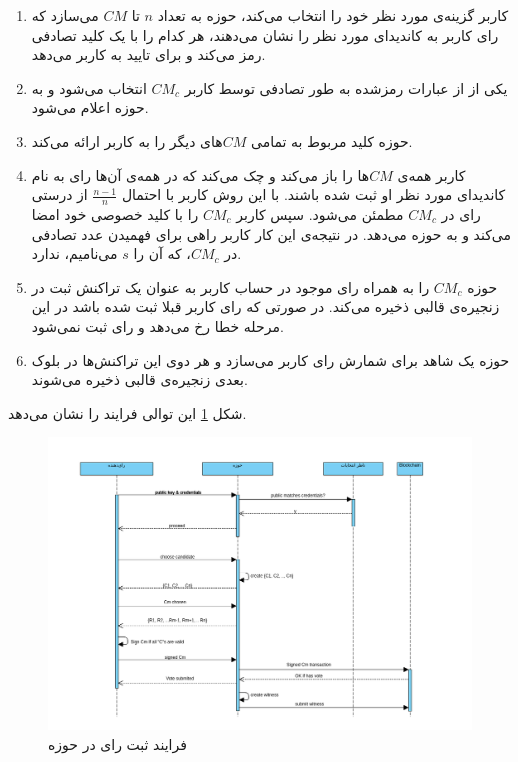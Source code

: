 \begin{enumerate}
	\item 
	کاربر گزینه‌ی مورد نظر خود را انتخاب می‌کند، حوزه به تعداد $n$ تا $CM$ می‌سازد که رای کاربر به کاندیدای مورد نظر را نشان می‌دهند، هر کدام را با یک کلید تصادفی رمز می‌کند و برای تایید به کاربر می‌دهد. 
	\item 
	یکی از از عبارات رمزشده به طور تصادفی توسط کاربر $CM_c$ انتخاب می‌شود و به حوزه اعلام می‌شود.
	\item 
	حوزه کلید مربوط به تمامی $CM$های دیگر را به کاربر ارائه می‌کند.
	\item 
	کاربر همه‌ی $CM$ها را باز می‌کند و چک می‌کند که در همه‌ی آن‌ها رای به نام کاندیدای مورد نظر او ثبت شده باشند. با این روش کاربر با احتمال $\frac{n-1}{n}$ از درستی رای در $CM_c$ مطمئن می‌شود. سپس کاربر $CM_c$ را با کلید خصوصی خود امضا می‌کند و به حوزه می‌دهد. در نتیجه‌ی این کار کاربر راهی برای فهمیدن عدد تصادفی در $CM_c$، که آن را $s$ می‌نامیم، ندارد.
	\item
	حوزه $CM_c$ را به همراه رای موجود در حساب کاربر به عنوان یک تراکنش ثبت در زنجیره‌ی قالبی ذخیره می‌کند. در صورتی که رای کاربر قبلا ثبت شده باشد در این مرحله خطا رخ می‌دهد و رای ثبت نمی‌شود. 
	\item
	حوزه یک شاهد برای شمارش رای کاربر می‌سازد و هر دوی این تراکنش‌ها در بلوک بعدی زنجیره‌ی قالبی ذخیره می‌شوند.
\end{enumerate}
شکل \ref{fig:seqdiag.png} این توالی فرایند را نشان می‌دهد.
\begin{figure}[t!]
	\centering
	\includegraphics[width=1\linewidth]{seqdiag.png}
	\caption {فرایند ثبت رای در حوزه}
	\label{fig:seqdiag.png}
\end{figure}

